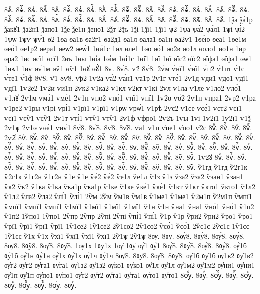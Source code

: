 {8ѧⷶ.
8ѧⷶ҇.
8ѧⷷ.
8ѧⷷ҇.
8ѧⷸ.
8ѧⷸ҇.
8ѧⷹ.
8ѧⷹ҇.
8ѧⷺ.
8ѧⷺ҇.
8ѧⷻ.
8ѧⷻ҇.
8ѧⷼ.
8ѧⷼ҇.
8ѧⷽ.
8ѧⷽ҇.
8ѧⷾ.
8ѧⷾ҇.
8ѧⷿ.
8ѧⷿ҇.
8ѧꙴ.
8ѧꙴ҇.
8ѧꙵ.
8ѧꙵ҇.
8ѧꙶ.
8ѧꙶ҇.
8ѧꙷ.
8ѧꙷ҇.
8ѧꙸ.
8ѧꙸ҇.
8ѧꙹ.
8ѧꙹ҇.
8ѧꙺ.
8ѧꙺ҇.
8ѧꙻ.
8ѧꙻ҇.
8ѧ꙼.
8ѧ꙼҇.
8ѧ꙽.
8ѧ꙽҇.
1ѯа
ѯа́1р
ѯакꙋ1
ѯа2н1
ѯапо1
1ѯе
ѯе1н
ѯено1
2ѯт
2ѯъ
1ѯі
1ѯї1
1ѯї1
ѱ2
1ѱа
ѱа́2
ѱа́л1
1ѱі
ѱі́2
1ѱѡ
1ѱѵ
ѱѵ́1
ѳ2
1ѳа
ѳа1в
ѳа2г1
ѳа2д1
ѳа1л
ѳала1
ѳа1н
ѳа2ѵ1
1ѳе́ю
ѳеа1
1ѳе1м
ѳео́1
ѳе1р2
ѳера1
ѳеѡ2
ѳеѡ́1
1ѳи́1с
1ѳл
ѳле1
1ѳо
ѳо́1
ѳо2в
ѳо1л
ѳоло1
ѳо1н
1ѳр
ѳра2
1ѳс
ѳсї1
ѳсї1
2ѳъ
1ѳы
1ѳі́а
1ѳі́м
1ѳі́1с
1ѳі̑1
1ѳї
1ѳї
ѳїс2
ѳїс2
ѳїфа1
ѳїфа1
ѳѡ1
1ѳѧ1
1ѳѵ
ѳѵ́1м
ѳѷ1
ѳѷ1
1ѳꙋ
ѳꙋ́1
8ѵ.
8ѵ̀8.
ѵ2́
8ѵ́8.
2ѵ́м
ѵ́нї1
ѵ́нї1
ѵ́п2
ѵ́1пт
ѵ́1с
ѵ́те1
ѵ́1ф
8ѵ̈8.
ѵ̑1
8ѵ̑8.
ѵ̑р2
1ѵ2а
ѵа́2
ѵа́н1
ѵа1р
2ѵ1г
ѵге́1
2ѵ1д
ѵди1
ѵдо1
ѵдї1
ѵдї1
1ѵ2е2
1ѵ2и
ѵи1н
2ѵк2
ѵ1ка2
ѵ1кл
ѵ2кт
ѵ1кі
2ѵл
ѵ1ла
ѵ1ле
ѵ1ло2
ѵло́1
ѵ1лꙋ
2ѵ1м
ѵма́1
ѵме́1
2ѵ1н
ѵно2
ѵно́1
ѵнї1
ѵнї1
1ѵ2о
ѵо́2
2ѵ1п
ѵпра1
2ѵр2
ѵ1ра
ѵ1ре2
ѵ1ры
ѵ1рі
ѵрі́1
ѵ1рї1
ѵ1рї1
ѵ1рѡ
ѵрѡ́1
ѵ1рѣ
2ѵс2
ѵ1се
ѵсе́1
ѵст2
ѵсї1
ѵсї1
ѵсѷ1
ѵсѷ1
2ѵ1т
ѵті́1
ѵтѷ1
ѵтѷ1
2ѵ1ф
ѵфро1
2ѵ2ъ
1ѵы
1ѵі
1ѵ2ї1
1ѵ2ї1
ѵ1ѯ
2ѵ1ѱ
2ѵ1ѳ
ѵѳа́1
ѵѳѵ́1
8ѵ҆̀8.
8ѵ҆́8.
8ѵ҆̈8.
8ѵ҆̑8.
ѵ҆а1
ѵ҆1п
ѵ҆пе1
ѵ҆по1
ѵ҆2с
8ѵⷠ.
8ѵⷠ҇.
8ѵⷡ.
8ѵⷡ҇.
2ѵ2ⷢ
8ѵⷢ.
8ѵⷢ҇.
8ѵⷣ.
8ѵⷣ҇.
8ѵⷤ.
8ѵⷤ҇.
8ѵⷥ.
8ѵⷥ҇.
8ѵⷦ.
8ѵⷦ҇.
8ѵⷧ.
8ѵⷧ҇.
8ѵⷨ.
8ѵⷨ҇.
8ѵⷩ.
8ѵⷩ҇.
8ѵⷪ.
8ѵⷪ҇.
8ѵⷫ.
8ѵⷫ҇.
8ѵⷬ.
8ѵⷬ҇.
8ѵⷭ.
8ѵⷭ҇.
8ѵⷮ.
8ѵⷮ҇.
8ѵⷯ.
8ѵⷯ҇.
8ѵⷰ.
8ѵⷰ҇.
8ѵⷱ.
8ѵⷱ҇.
8ѵⷲ.
8ѵⷲ҇.
8ѵⷳ.
8ѵⷳ҇.
8ѵⷴ.
8ѵⷴ҇.
8ѵⷵ.
8ѵⷵ҇.
8ѵⷶ.
8ѵⷶ҇.
8ѵⷷ.
8ѵⷷ҇.
8ѵⷸ.
8ѵⷸ҇.
8ѵⷹ.
8ѵⷹ҇.
8ѵⷺ.
8ѵⷺ҇.
8ѵⷻ.
8ѵⷻ҇.
8ѵⷼ.
8ѵⷼ҇.
8ѵⷽ.
8ѵⷽ҇.
8ѵⷾ.
8ѵⷾ҇.
8ѵⷿ.
8ѵⷿ҇.
1ѵ2ꙋ
8ѵꙴ.
8ѵꙴ҇.
8ѵꙵ.
8ѵꙵ҇.
8ѵꙶ.
8ѵꙶ҇.
8ѵꙷ.
8ѵꙷ҇.
8ѵꙸ.
8ѵꙸ҇.
8ѵꙹ.
8ѵꙹ҇.
8ѵꙺ.
8ѵꙺ҇.
8ѵꙻ.
8ѵꙻ҇.
8ѵ꙼.
8ѵ꙼҇.
8ѵ꙽.
8ѵ꙽҇.
ѷ1гд
ѷ1гд
ѷ2г1к
ѷ2г1к
ѷ1г2н
ѷ1г2н
ѷ1е
ѷ1е
ѷе́2
ѷе́2
ѷе1л
ѷе1л
ѷ1з
ѷ1з
ѷза2
ѷза2
ѷзан1
ѷзан1
ѷк2
ѷк2
ѷ1ка
ѷ1ка
ѷка1р
ѷка1р
ѷ1ке
ѷ1ке
ѷке́1
ѷке́1
ѷ1кт
ѷ1кт
ѷкто1
ѷкто1
ѷ1л2
ѷ1л2
ѷла2
ѷла2
ѷлі́1
ѷлі́1
2ѷм
2ѷм
ѷм1в
ѷм1в
ѷ1ме1
ѷ1ме1
ѷ2м1п
ѷ2м1п
ѷмпї1
ѷмпї1
ѷмпї1
ѷмпї1
ѷ1мї1
ѷ1мї1
ѷ1мї1
ѷ1мї1
ѷ1н
ѷ1н
ѷна1
ѷна1
ѷно́1
ѷно́1
ѷ1п2
ѷ1п2
1ѷпо1
1ѷпо1
2ѷпр
2ѷпр
2ѷпі
2ѷпі
ѷпі́1
ѷпі́1
ѷ1р
ѷ1р
ѷри2
ѷри2
ѷро1
ѷро1
ѷрї1
ѷрї1
ѷрї1
ѷрї1
1ѷ1се2
1ѷ1се2
2ѷ1со2
2ѷ1со2
ѷсо́1
ѷсо́1
2ѷс1с
2ѷс1с
1ѷ1сє
1ѷ1сє
ѷ1х
ѷ1х
ѷхї1
ѷхї1
ѷхї1
ѷхї1
2ѷ1ѱ
2ѷ1ѱ
8ѹ.
8ᲂу.
8ѹ̀8.
8ᲂу̀8.
8ѹ́8.
8ᲂу́8.
8ѹ̈8.
8ᲂӱ8.
8ѹ̑8.
8ᲂу̑8.
1ѹ1х
1ᲂу1х
1ѹ҆
1ᲂу҆
ѹ҆̀1
ᲂу҆̀1
8ѹ҆̀8.
8ᲂу҆̀8.
8ѹ҆́8.
8ᲂу҆́8.
ѹ҆́1б
ᲂу҆́1б
ѹ҆́1н
ᲂу҆́1н
ѹ҆́1х
ᲂу҆́1х
ѹ҆́1ч
ᲂу҆́1ч
8ѹ҆̈8.
8ᲂу҆̈8.
8ѹ҆̑8.
8ᲂу҆̑8.
ѹ҆1б
ᲂу҆1б
ѹ҆1в2
ᲂу҆1в2
ѹ҆г2
ᲂу҆г2
ѹ҆га1
ᲂу҆га1
ѹ҆1з2
ᲂу҆1з2
ѹ҆ко1
ᲂу҆ко1
ѹ҆1л
ᲂу҆1л
ѹ҆1м2
ᲂу҆1м2
ѹ҆ни1
ᲂу҆ни1
ѹ҆1п
ᲂу҆1п
ѹ҆по1
ᲂу҆по1
ѹ҆т2
ᲂу҆т2
ѹ҆та1
ᲂу҆та1
ѹ҆то1
ᲂу҆то1
8ѹⷠ.
8ᲂуⷠ.
8ѹⷠ҇.
8ᲂуⷠ҇.
8ѹⷡ.
8ᲂуⷡ.
8ѹⷡ҇.
8ᲂуⷡ҇.
8ѹⷢ.
8ᲂуⷢ.
}
